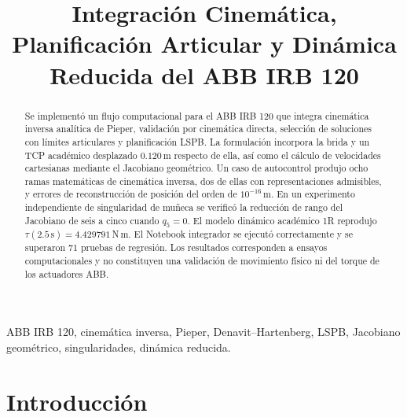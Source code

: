 \documentclass[conference]{IEEEtran}
\begin{document}
\title{Integración Cinemática, Planificación Articular y Dinámica Reducida del ABB IRB 120}

\author{
\and
{}
}

\maketitle

\begin{abstract}
Se implementó un flujo computacional para el ABB IRB 120 que integra cinemática inversa analítica de Pieper, validación por cinemática directa, selección de soluciones con límites articulares y planificación LSPB. La formulación incorpora la brida y un TCP académico desplazado $0.120$\,m respecto de ella, así como el cálculo de velocidades cartesianas mediante el Jacobiano geométrico. Un caso de autocontrol produjo ocho ramas matemáticas de cinemática inversa, dos de ellas con representaciones admisibles, y errores de reconstrucción de posición del orden de $10^{-16}$\,m. En un experimento independiente de singularidad de muñeca se verificó la reducción de rango del Jacobiano de seis a cinco cuando $q_5=0$. El modelo dinámico académico 1R reprodujo $\tau(2.5\,\mathrm{s})=4.429791$\,N\,m. El Notebook integrador se ejecutó correctamente y se superaron 71 pruebas de regresión. Los resultados corresponden a ensayos computacionales y no constituyen una validación de movimiento físico ni del torque de los actuadores ABB.
\end{abstract}

\begin{IEEEkeywords}
ABB IRB 120, cinemática inversa, Pieper, Denavit--Hartenberg, LSPB, Jacobiano geométrico, singularidades, dinámica reducida.
\end{IEEEkeywords}

\section{Introducción}
\end{document}
